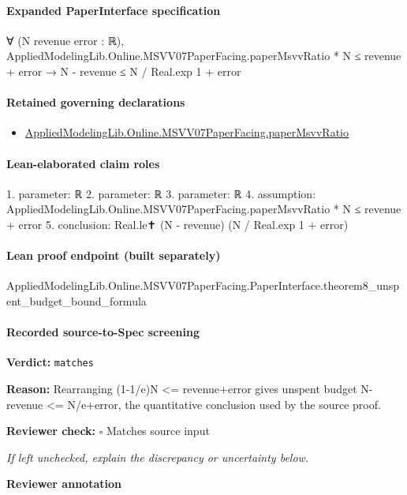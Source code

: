 \documentclass[10pt]{article}
\newcommand{\reviewerbox}{%
  \par\noindent\fbox{\parbox{0.96\linewidth}{\rule{0pt}{0.38in}}}\par
}
\newcommand{\reviewmatch}[1]{%
  \par\noindent\textbf{Reviewer check:} $\square$\; #1\par
  \noindent\emph{If left unchecked, explain the discrepancy or uncertainty below.}\par
}
\begin{document}
\paragraph{Expanded PaperInterface specification}
\begin{ReviewVerbatim}
∀ (N revenue error : ℝ),
  AppliedModelingLib.Online.MSVV07PaperFacing.paperMsvvRatio * N ≤ revenue + error →
    N - revenue ≤ N / Real.exp 1 + error
\end{ReviewVerbatim}

\paragraph{Retained governing declarations}
\begin{itemize}\raggedright
\item \hyperlink{governing-declaration-11865634591d1a39}{Applied\allowbreak{}Modeling\allowbreak{}Lib.\allowbreak{}Online.\allowbreak{}MSVV07\allowbreak{}Paper\allowbreak{}Facing.\allowbreak{}paper\allowbreak{}Msvv\allowbreak{}Ratio}
\end{itemize}
\paragraph{Lean-elaborated claim roles}\begin{ReviewVerbatim}
1. parameter: ℝ
2. parameter: ℝ
3. parameter: ℝ
4. assumption: AppliedModelingLib.Online.MSVV07PaperFacing.paperMsvvRatio * N ≤ revenue + error
5. conclusion: Real.le✝ (N - revenue) (N / Real.exp 1 + error)
\end{ReviewVerbatim}

\paragraph{Lean proof endpoint (built separately)}\begin{ReviewVerbatim}
AppliedModelingLib.Online.MSVV07PaperFacing.PaperInterface.theorem8_unspent_budget_bound_formula
\end{ReviewVerbatim}

\paragraph{Recorded source-to-Spec screening}
\textbf{Verdict:} \texttt{matches}
\\
{\raggedright
\textbf{Reason:} Rearranging (1-\allowbreak{}1/\allowbreak{}e)N <= revenue+error gives unspent budget N-\allowbreak{}revenue <= N/\allowbreak{}e+error, the quantitative conclusion used by the source proof.\allowbreak{}
\par}
\reviewmatch{Matches source input}
\noindent\textbf{Reviewer annotation}\par
\reviewerbox
\clearpage
\hypertarget{source-claim-f5f74a26e3d17ad7}{}
\end{document}
